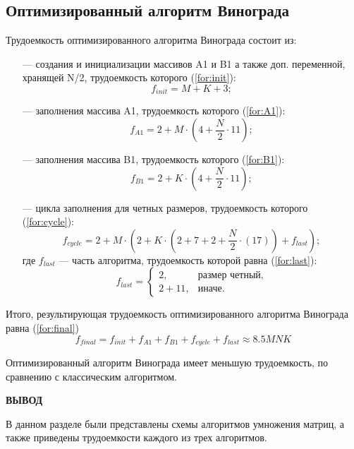\subsection{Оптимизированный алгоритм Винограда}
Трудоемкость оптимизированного алгоритма Винограда состоит из:
\begin{itemize}
	\item[---] создания и инициализации массивов A1 и B1 а также доп. переменной, хранящей N/2, трудоемкость которого (\ref{for:init}):
	\begin{equation}
		\label{for:init}
		f_{init} = M + K + 3;
	\end{equation}
	
	\item[---] заполнения массива A1, трудоемкость которого (\ref{for:A1}):
	\begin{equation}
		\label{for:A1}
		f_{A1} = 2 + M \cdot (4 + \frac{N}{2} \cdot 11);
	\end{equation}
	
	\item[---] заполнения массива B1, трудоемкость которого (\ref{for:B1}):
	\begin{equation}
		\label{for:B1}
		f_{B1} = 2 + K \cdot (4 + \frac{N}{2} \cdot 11);
	\end{equation}
	
	\item[---] цикла заполнения для четных размеров, трудоемкость которого (\ref{for:cycle}):
	\begin{equation}
		\label{for:cycle}
		f_{cycle} = 2 + M \cdot (2 + K \cdot (2 + 7 + 2 + \frac{N}{2} \cdot (17)) + f_{last});		
	\end{equation}
	где $f_{last}$ ---  часть алгоритма, трудоемкость которой равна (\ref{for:last}):
	\begin{equation}
		\label{for:last}
		f_{last} = \begin{cases}
			2, & \text{размер четный,}\\
			2 + 11, & \text{иначе.}
		\end{cases}
	\end{equation}
\end{itemize}

Итого, результирующая трудоемкость оптимизированного алгоритма Винограда равна (\ref{for:final})
\begin{equation}
	\label{for:final}
	f_{final} = f_{init} + f_{A1} + f_{B1} + f_{cycle} + f_{last} \approx 8.5MNK
\end{equation}

Оптимизированный алгоритм Винограда имеет меньшую трудоемкость, по сравнению с классическим алгоритмом.

\vspace{5mm}

\textbf{ВЫВОД}

 В данном разделе были представлены схемы алгоритмов умножения матриц, а также приведены трудоемкости каждого из трех алгоритмов.

\clearpage